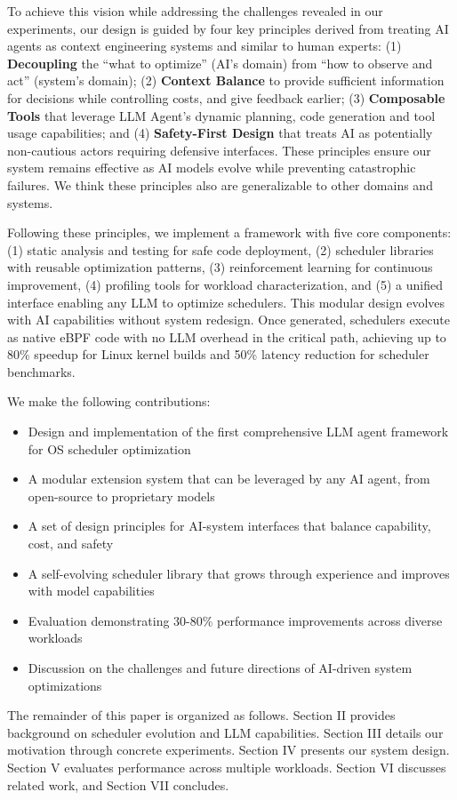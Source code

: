 To achieve this vision while addressing the challenges revealed in our experiments, our design is guided by four key principles derived from treating AI agents as context engineering systems and similar to human experts: (1) \textbf{Decoupling} the ``what to optimize'' (AI's domain) from ``how to observe and act'' (system's domain); (2) \textbf{Context Balance} to provide sufficient information for decisions while controlling costs, and give feedback earlier; (3) \textbf{Composable Tools} that leverage LLM Agent's dynamic planning, code generation and tool usage capabilities; and (4) \textbf{Safety-First Design} that treats AI as potentially non-cautious actors requiring defensive interfaces. These principles ensure our system remains effective as AI models evolve while preventing catastrophic failures. We think these principles also are generalizable to other domains and systems.

Following these principles, we implement a framework with five core components: (1) static analysis and testing for safe code deployment, (2) scheduler libraries with reusable optimization patterns, (3) reinforcement learning for continuous improvement, (4) profiling tools for workload characterization, and (5) a unified interface enabling any LLM to optimize schedulers. This modular design evolves with AI capabilities without system redesign. Once generated, schedulers execute as native eBPF code with no LLM overhead in the critical path, achieving up to 80\% speedup for Linux kernel builds and 50\% latency reduction for scheduler benchmarks.

We make the following contributions:
\begin{itemize}
\item Design and implementation of the first comprehensive LLM agent framework for OS scheduler optimization
\item A modular extension system that can be leveraged by any AI agent, from open-source to proprietary models
\item A set of design principles for AI-system interfaces that balance capability, cost, and safety
\item A self-evolving scheduler library that grows through experience and improves with model capabilities
\item Evaluation demonstrating 30-80\% performance improvements across diverse workloads
\item Discussion on the challenges and future directions of AI-driven system optimizations
\end{itemize}

The remainder of this paper is organized as follows. Section II provides background on scheduler evolution and LLM capabilities. Section III details our motivation through concrete experiments. Section IV presents our system design. Section V evaluates performance across multiple workloads. Section VI discusses related work, and Section VII concludes.